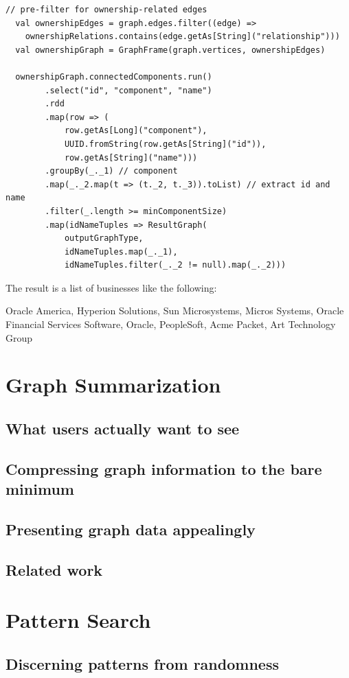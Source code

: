\documentclass[
        a4paper,     %
        titlepage,   %
        oneside,     %
        parskip      %
        ]{scrartcl}  %
\begin{document}
  \begin{lstlisting}[style=scalaStyle,caption=processGraph in $CompanyGroupExtractor$]
  // pre-filter for ownership-related edges
  val ownershipEdges = graph.edges.filter((edge) =>
    ownershipRelations.contains(edge.getAs[String]("relationship")))
  val ownershipGraph = GraphFrame(graph.vertices, ownershipEdges)

  ownershipGraph.connectedComponents.run()
		.select("id", "component", "name")
		.rdd
		.map(row => (
			row.getAs[Long]("component"),
			UUID.fromString(row.getAs[String]("id")),
			row.getAs[String]("name")))
		.groupBy(_._1) // component
		.map(_._2.map(t => (t._2, t._3)).toList) // extract id and name
		.filter(_.length >= minComponentSize)
		.map(idNameTuples => ResultGraph(
			outputGraphType,
			idNameTuples.map(_._1),
			idNameTuples.filter(_._2 != null).map(_._2)))
  \end{lstlisting}

  The result is a list of businesses like the following:

  Oracle America, Hyperion Solutions, Sun Microsystems, Micros Systems, Oracle Financial Services Software, Oracle, PeopleSoft, Acme Packet, Art Technology Group


  \section{Graph Summarization}
    \subsection{What users actually want to see}
    \subsection{Compressing graph information to the bare minimum}
    \subsection{Presenting graph data appealingly}
    \subsection{Related work}
    \pagebreak

  \section{Pattern Search}
    \subsection{Discerning patterns from randomness}
\end{document}
